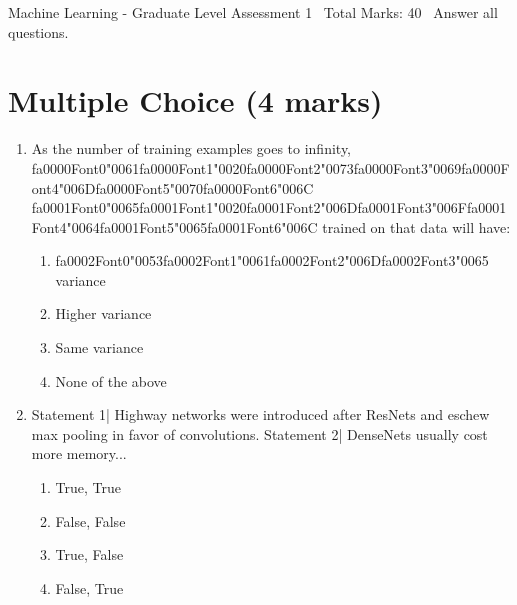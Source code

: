 \documentclass[12pt]{article}
\begin{document}
\begin{center}
Machine Learning - Graduate Level Assessment 1 \
Total Marks: 40 \
Answer all questions.
\end{center}

\section*{Multiple Choice (4 marks)}
\begin{enumerate}[label=\arabic*.]
\item As the number of training examples goes to infinity, {\csname fa0000Font0\endcsname\char"0061}{\csname fa0000Font1\endcsname\char"0020}{\csname fa0000Font2\endcsname\char"0073}{\csname fa0000Font3\endcsname\char"0069}{\csname fa0000Font4\endcsname\char"006D}{\csname fa0000Font5\endcsname\char"0070}{\csname fa0000Font6\endcsname\char"006C} {\csname fa0001Font0\endcsname\char"0065}{\csname fa0001Font1\endcsname\char"0020}{\csname fa0001Font2\endcsname\char"006D}{\csname fa0001Font3\endcsname\char"006F}{\csname fa0001Font4\endcsname\char"0064}{\csname fa0001Font5\endcsname\char"0065}{\csname fa0001Font6\endcsname\char"006C} trained on that data will have:
\begin{enumerate}[label=(\alph*)]
    \item {\csname fa0002Font0\endcsname\char"0053}{\csname fa0002Font1\endcsname\char"0061}{\csname fa0002Font2\endcsname\char"006D}{\csname fa0002Font3\endcsname\char"0065} variance
    \item Higher variance
    \item Same variance
    \item None of the above
\end{enumerate}
\item Statement 1| Highway networks were introduced after ResNets and eschew max pooling in favor of convolutions. Statement 2| DenseNets usually cost more memory...
\begin{enumerate}[label=(\alph*)]
    \item True, True
    \item False, False
    \item True, False
    \item False, True
\end{enumerate}
\end{enumerate}
\end{document}
